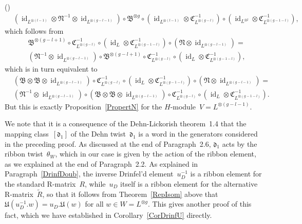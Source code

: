\documentclass[12pt]{article}
\makeatletter
\newcounter{num}
\newenvironment{pflist}{\begin{list}{(\arabic{num})}{\usecounter{num} \leftmargin0cm \itemindent5pt}}{\end{list}}
\theoremstyle{definition}
\theoremstyle{break}
\renewenvironment{proof}[1][\proofname]{\par
\vspace{-5pt}%
\pushQED{\qed}%
\normalfont
\topsep0pt \partopsep0pt %
\trivlist
\item[\hskip\labelsep
\bfseries
#1\@addpunct{.}]\ignorespaces
}{%
\popQED\endtrivlist\@endpefalse
\addvspace{6pt plus 6pt} %
}
\DeclareMathOperator\id{id}
\newcommand{\fB}{\mathfrak{B}}
\newcommand{\fC}{\mathfrak{C}}
\newcommand{\fN}{\mathfrak{N}}
\newcommand{\fU}{\mathfrak{U}}
\newcommand{\fd}{\mathfrak{d}}
\renewcommand{\1}{\mathbbm{1}}
\newcommand{\ot}{\mathbin{\otimes}}
\makeatother
\begin{document}
\begin{proof}
\begin{pflist}
\begin{align*}
&(\id_{L^{\ot (l-1)}} \ot \fN^{-1} \ot \id_{L^{\ot (g-l-1)}}) \circ \fB^{\ot g} \circ (\id_{L^{\ot (l-1)}} \ot \fC_{L^{\ot (g-l)}}^{-1})
\circ (\id_{L^{\ot l}} \ot \fC_{L^{\ot (g-1-l)}}^{-1}),
\end{align*}
which follows from
\begin{align*}
&\fB^{\ot (g-l+1)} \circ \fC_{L^{\ot (g-l)}}^{-1} \circ (\id_{L} \ot \fC_{L^{\ot (g-1-l)}}^{-1}) \circ (\fN \ot \id_{L^{\ot (g-l-1)}}) = \\
&(\fN^{-1} \ot \id_{L^{\ot (g-l-1)}}) \circ \fB^{\ot (g-l+1)}
\circ \fC_{L^{\ot (g-l)}}^{-1} \circ (\id_{L} \ot \fC_{L^{\ot (g-1-l)}}^{-1}),
\end{align*}
which is in turn equivalent to
\begin{align*}
&(\fB \ot \fB \ot \id_{L^{\ot (g-l-1)}}) \circ \fC_{L^{\ot (g-l)}}^{-1} \circ (\id_{L} \ot \fC_{L^{\ot (g-1-l)}}^{-1}) \circ (\fN \ot \id_{L^{\ot (g-l-1)}}) = \\
&(\fN^{-1} \ot \id_{L^{\ot (g-l-1)}}) \circ (\fB \ot \fB \ot \id_{L^{\ot (g-l-1)}})
\circ \fC_{L^{\ot (g-l)}}^{-1} \circ (\id_{L} \ot \fC_{L^{\ot (g-1-l)}}^{-1}).
\end{align*}
But this is exactly Proposition~\ref{PropertN} for the $H$-module~$V=L^{\ot (g-l-1)}$.
\qedhere
\end{pflist}
\end{proof}

We note that it is a consequence of the Dehn-Lickorish theorem~1.4 that the mapping class~$[\fd_1]$ of the Dehn twist~$\fd_1$ is a word in the generators considered in the preceding proof. As discussed at the end of Paragraph~2.6, $\fd_1$ acts by the ribbon twist~$\theta_W$, which in our case is given by the action of the ribbon element, as we explained at the end of Paragraph~2.2. As explained in Paragraph~\ref{DrinfDoub}, the inverse Drinfel'd element~$u_D^{-1}$ is a ribbon element for the standard R-matrix~$R$, while~$u_D$ itself is a ribbon element for the alternative R-matrix~$\tilde{R}$, so that it follows from Theorem~\ref{RepIsom} above that $\fU(u_D^{-1}.w) = u_D.\fU(w)$ for all $w \in W = L^{\ot g}$. This gives another proof of this fact, which we have established in Corollary~\ref{CorDrinfU} directly.
\end{document}
